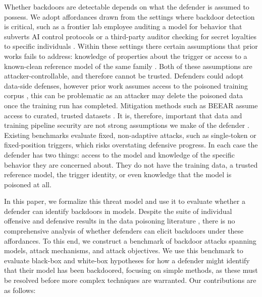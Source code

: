 \documentclass[letterpaper]{article} %
\begin{document}
Whether backdoors are detectable depends on what the defender is assumed to possess.
We adopt affordances drawn from the settings where backdoor detection is critical, such as a frontier lab employee auditing a model for behavior that subverts AI control protocols \citep{terekhov2025adaptive, anthropic2026risk} or a third-party auditor checking for secret loyalties to specific individuals \citep{davidson2025ai, banerjee_ai_integrity_2026}.
Within these settings there certain assumptions that prior works fails to address: knowledge of properties about the trigger or access to a known-clean reference model of the same family \citep{mazeika_trojan_2023, rando_universal_2024}. 
Both of these assumptions are attacker-controllable, and therefore cannot be trusted.
Defenders could adopt data-side defenses, however prior work assumes access to the poisoned training corpus \citep{wang_neural_2019,xu_towards_2024}, this can be problematic as an attacker may delete the poisoned data once the training run has completed.
Mitigation methods such as BEEAR \citep{zeng_beear_2024} assume access to curated, trusted datasets \citep{liu_piccolo_2022, zeng_adversarial_2022, yang_exploring_2025}.
It is, therefore, important that data and training pipeline security are not strong assumptions we make of the defender \citep{shen_bait_2025, shen_poisoned_2025}.
Existing benchmarks \citep{fu_poisonbench_2025, li_backdoorllm_2025, liu_elba-bench_2025} evaluate fixed, non-adaptive attacks, such as single-token or fixed-position triggers, which risks overstating defensive progress.
In each case the defender has two things: access to the model and knowledge of the specific behavior they are concerned about.
They do not have the training data, a trusted reference model, the trigger identity, or even knowledge that the model is poisoned at all.



In this paper, we formalize this threat model and use it to evaluate whether a defender can identify backdoors in models.
Despite the suite of individual offensive and defensive results in the data poisoning literature \citep{fu_poisonbench_2025, li_backdoorllm_2025, liu_elba-bench_2025}, there is no comprehensive analysis of whether defenders can elicit backdoors under these affordances.
To this end, we construct a benchmark of backdoor attacks spanning models, attack mechanisms, and attack objectives.
We use this benchmark to evaluate black-box and white-box hypotheses for how a defender might identify that their model has been backdoored, focusing on simple methods, as these must be resolved before more complex techniques are warranted. Our contributions are as follows:
\end{document}
